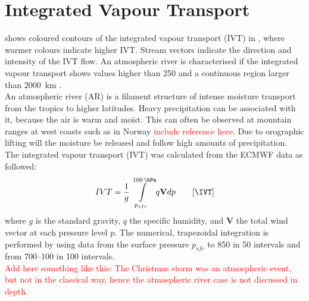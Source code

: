 \section{Integrated Vapour Transport}
\label{sec:atm_riv}
% 
 shows coloured contours of the integrated vapour transport (IVT) in \SI{}{\IVT}, where warmer colours indicate higher IVT. Stream vectors indicate the direction and intensity of the IVT flow. An atmospheric river is characterised if the integrated vapour transport shows values higher than \SI{250}{\IVT} and a continuous region larger than \SI{2000}{\km} \citep{rutz_climatological_2014}.
\\
An atmospheric river (AR) is a filament structure of intense moisture transport from the tropics to higher latitudes. 
Heavy precipitation can be associated with it, because the air is warm and moist. This can often be observed at mountain ranges at west coasts such as in Norway \textcolor{red}{include reference here}. Due to orographic lifting will the moisture be released and follow high amounts of precipitation.  
\\
The integrated vapour transport (IVT) was calculated from the ECMWF data as followed:
\begin{align}
IVT = \frac{1}{g} \int\limits_{p_{sfc}}^{\SI{100}{\hPa}} q \mathbf{V} dp \qquad [\SI{}{\IVT}]
\label{eq:IVT}
\end{align} 
where $g$ is the standard gravity, $q$ the specific humidity, and $\mathbf{V}$ the total wind vector at each pressure level $p$. The numerical, trapezoidal integration is performed by using data from the surface pressure $p_{sfc}$ to \SI{850}{\hPa} in \SI{50}{\hPa} intervals and from \SIrange{700}{100}{\hPa} in \SI{100}{\hPa} intervals.
\\
\textcolor{red}{Add here something like this:
The Christmas storm was an atmospheric event, but not in the classical way, hence the atmospheric river case is not discussed in depth.}

